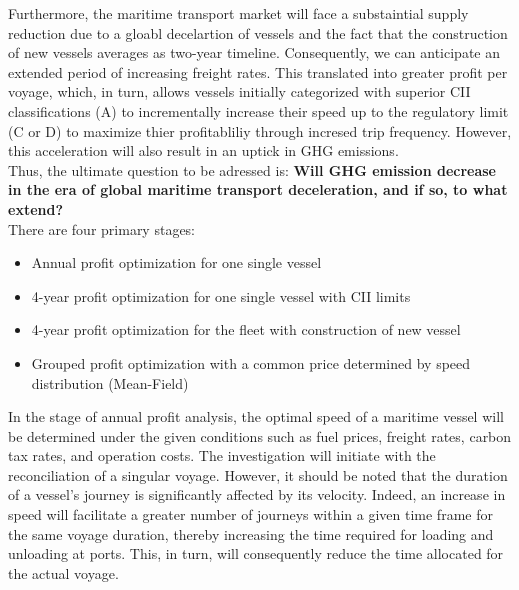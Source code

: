 \documentclass[a4paper,12pt]{article}
\begin{document}
Furthermore, the maritime transport market will face a substaintial supply reduction due to a gloabl decelartion of vessels and the fact that the construction of new vessels averages as two-year timeline. 
Consequently, we can anticipate an extended period of increasing freight rates. 
This translated into greater profit per voyage, which, in turn, allows vessels initially categorized with superior CII classifications (A) to incrementally increase their speed up to the regulatory limit (C or D) to maximize thier profitabliliy through incresed trip frequency.
However, this acceleration will also result in an uptick in GHG emissions.\\

Thus, the ultimate question to be adressed is: \textbf{Will GHG emission decrease in the era of global maritime transport deceleration, and if so, to what extend?}\\

There are four primary stages:
\begin{itemize}
	\item Annual profit optimization for one single vessel
	\item 4-year profit optimization for one single vessel with CII limits
	\item 4-year profit optimization for the fleet with construction of new vessel
	\item Grouped profit optimization with a common price determined by speed distribution (Mean-Field) \\
\end{itemize}

In the stage of annual profit analysis, the optimal speed of a maritime vessel will be determined under the given conditions such as fuel prices, freight rates, carbon tax rates, and operation costs.
The investigation will initiate with the reconciliation of a singular voyage.
However, it should be noted that the duration of a vessel's journey is significantly affected by its velocity.
Indeed, an increase in speed will facilitate a greater number of journeys within a given time frame for the same voyage duration, thereby increasing the time required for loading and unloading at ports.
This, in turn, will consequently reduce the time allocated for the actual voyage.\\
\end{document}
